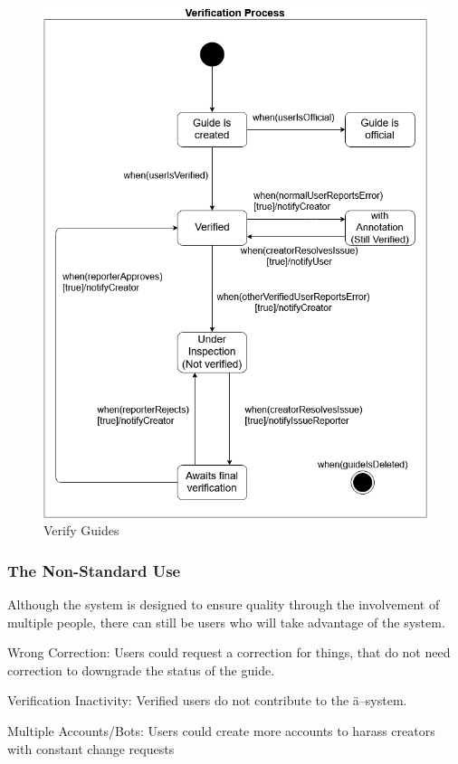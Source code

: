 \documentclass[12pt]{article}
\theoremstyle{definition}
\newenvironment{text}{
   \setlength{\parindent}{0pt}
   \color{black}
}{}
\begin{document}
    \begin{figure}[hbt!]
    \centering
    \includegraphics[width=0.8\linewidth]{StateDiagram/GuideVerificationSD.png}
    \caption{Verify Guides}
    \label{fig:verifyguides_sd_dg}
    \end{figure}
    
    \pagebreak

    \subsubsection{The Non-Standard Use}
\begin{text}
Although the system is designed to ensure quality through the involvement of multiple people, there can still be users who will take advantage of the system.

Wrong Correction: Users could request a correction for things, that do not need correction to downgrade the status of the guide.

Verification Inactivity: Verified users do not contribute to the ä--system.

Multiple Accounts/Bots: Users could create more accounts to harass creators with constant change requests
\end{text}
\end{document}
